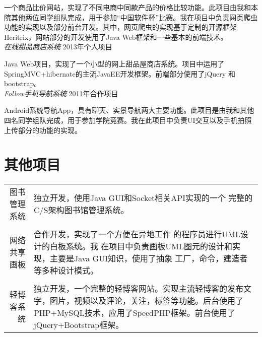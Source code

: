 \documentclass[10pt]{article} %
\begin{document}
{\begin{minipage}[t]{0.5\textwidth}
\normalsize{一个商品比价网站，实现了不同电商中同款产品的价格比较功能。此项目由我和本院其他两位同学组队完成，用于参加“中国软件杯”比赛。我在项目中负责网页爬虫功能的实现以及部分前台开发。其中，网页爬虫的实现基于定制的开源框架Heritrix，网站部分的开发使用了Java Web框架和一些基本的前端技术。}\\


{\large \textit{在线甜品商店系统}} \hfill  \hfill {\textsc{2013年\quad 个人项目}\\}

\normalsize{Java Web项目，实现了一个小型的网上甜品屋商店系统。项目中运用了SpringMVC+hibernate的主流JavaEE开发框架。前端部分使用了jQuery 和bootstrap。}\\

{\large \textit{Follow手机导航系统}} \hfill  \hfill {\textsc{2011年\quad 合作项目}\\}

\normalsize{Android系统导航App，具有聊天、实景导航两大主要功能。此项目是由我和其他四名同学组队完成，用于参加学院竞赛。我在此项目中负责UI交互以及手机拍照上传部分的功能的实现。}\\



\section{其他项目} 

\begin{tabular}{rl}
     图书管理系统 & 
     \begin{minipage}[t]{0.72\textwidth}
     独立开发，使用Java GUI和Socket相关API实现的一个
     完整的C/S架构图书馆管理系统。
     \end{minipage}
     \\
	\\
     网络共享画板     & 
     \begin{minipage}[t]{0.72\textwidth}

     合作开发，实现了一个方便在异地工作
     的程序员进行UML设计的白板系统。我
     在项目中负责画板UML图元的设计和实
     现，主要是Java GUI知识，使用了抽象
     工厂，命令，建造者等多种设计模式。
     \end{minipage}
     \\
	\\
     轻博客系统 & 
     \begin{minipage}[t]{0.72\textwidth}
     独立开发，一个完整的轻博客网站。实现主流轻博客的发布文字，图片，视频以及评论，关注，标签等功能。后台使用了PHP+MySQL技术，应用了SpeedPHP框架。前台使用了jQuery+Bootstrap框架。
     \end{minipage}
\end{tabular}


\end{minipage}}
\end{document}
